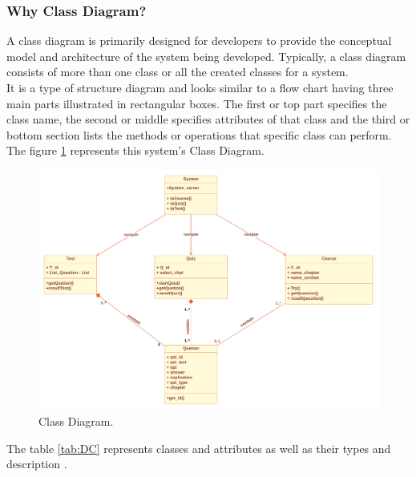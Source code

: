 \subsubsection{Why Class Diagram?}
A class diagram is primarily designed for developers to provide the conceptual model and architecture of the system being developed. Typically, a class diagram consists of more than one class or all the created classes for a system. \cite{Techopedia-DC} \\
It is a type of structure diagram and looks similar to a flow chart having three main parts illustrated in rectangular boxes. The first or top part specifies the class name, the second or middle specifies attributes of that class and the third or bottom section lists the methods or operations that specific class can perform. \cite{Techopedia-DC} \\

The figure \ref{fig:DC} represents this system's Class Diagram.


\begin{figure}[ht]
	\centering
	\label{}\includegraphics[scale=0.45]{img/UML class.pdf}                
	\caption{Class Diagram.} 
	\label{fig:DC}
\end{figure} 



\newpage
The table \ref{tab:DC} represents classes and attributes as well as their types and description .

